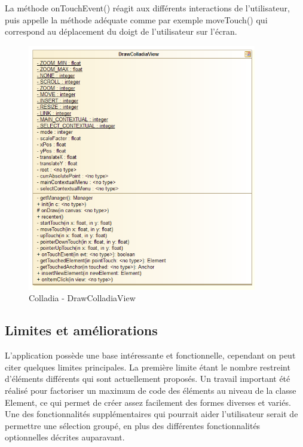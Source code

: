 La méthode onTouchEvent() réagit aux différents interactions de l'utilisateur, puis appelle la méthode adéquate comme par exemple moveTouch() qui correspond au déplacement du doigt de l'utilisateur sur l'écran.  
	\begin{figure}[!h]
		\centering
		\includegraphics[width=10cm]{img/UmlDrawView}
		\caption{Colladia - DrawColladiaView}
	\end{figure}

\subsection{Limites et améliorations}
L'application possède une base intéressante et fonctionnelle, cependant on peut citer quelques limites principales.
La première limite étant le nombre restreint d'éléments différents qui sont actuellement proposés. Un travail important été réalisé pour factoriser un maximum de code des éléments au niveau de la classe Element, ce qui permet de créer assez facilement des formes diverses et variés.
Une des fonctionnalités supplémentaires qui pourrait aider l'utilisateur serait de permettre une sélection groupé, en plus des différentes fonctionnalités optionnelles décrites auparavant. 